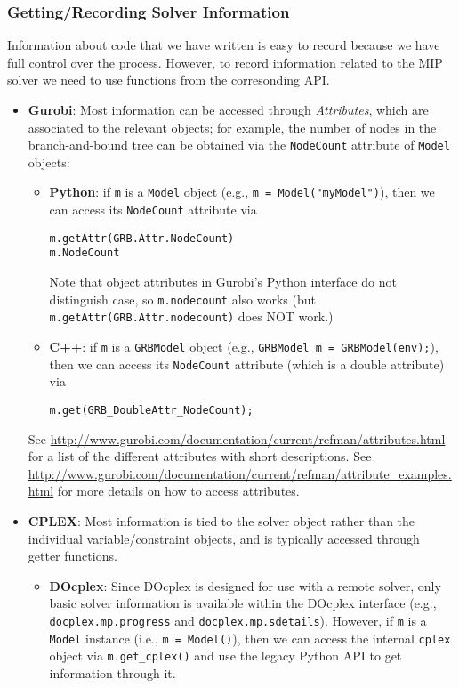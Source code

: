 \documentclass[12pt]{article}
\begin{document}
\subsubsection{Getting/Recording Solver Information}
Information about code that we have written is easy to record because we have full control over the process. However, to record information related to the MIP solver we need to use functions from the corresonding API.
\begin{itemize}
    \item \textbf{Gurobi}: Most information can be accessed through \emph{Attributes}, which are associated to the relevant objects; for example, the number of nodes in the branch-and-bound tree can be obtained via the \texttt{NodeCount} attribute of \texttt{Model} objects:
        \begin{itemize}
            \item \textbf{Python}: if \texttt{m} is a \texttt{Model} object (e.g., \texttt{m = Model("myModel")}), then we can access its \texttt{NodeCount} attribute via
\begin{verbatim}
m.getAttr(GRB.Attr.NodeCount)
m.NodeCount
\end{verbatim}
                Note that object attributes in Gurobi's Python interface do not distinguish case, so \texttt{m.nodecount} also works (but \texttt{m.getAttr(GRB.Attr.nodecount)} does NOT work.)
            \item \textbf{C++}: if \texttt{m} is a \texttt{GRBModel} object (e.g., \texttt{GRBModel m = GRBModel(env);}), then we can access its \texttt{NodeCount} attribute (which is a double attribute) via
\begin{verbatim}
m.get(GRB_DoubleAttr_NodeCount);
\end{verbatim}
        \end{itemize}
        See \url{http://www.gurobi.com/documentation/current/refman/attributes.html} for a list of the different attributes with short descriptions.  See \url{http://www.gurobi.com/documentation/current/refman/attribute_examples.html} for more details on how to access attributes.
    \item \textbf{CPLEX}: Most information is tied to the solver object rather than the individual variable/constraint objects, and is typically accessed through getter functions.
        \begin{itemize}
            \item \textbf{DOcplex}: Since DOcplex is designed for use with a remote solver, only basic solver information is available within the DOcplex interface (e.g., \href{https://cdn.rawgit.com/IBMDecisionOptimization/docplex-doc/master/docs/mp/docplex.mp.progress.html}{\texttt{docplex.mp.progress}} and \href{https://cdn.rawgit.com/IBMDecisionOptimization/docplex-doc/master/docs/mp/docplex.mp.sdetails.html}{\texttt{docplex.mp.sdetails}}). However, if \texttt{m} is a \texttt{Model} instance (i.e., \texttt{m = Model()}), then we can access the internal \texttt{cplex} object via \texttt{m.get\_cplex()} and use the legacy Python API to get information through it.

\end{itemize}
\end{itemize}
\end{document}
